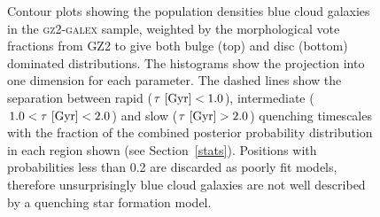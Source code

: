 \begin{figure}
\caption[Population densities of blue smooth and disc galaxies]{Contour plots showing the population densities blue cloud galaxies in the \textsc{gz2-galex} sample, weighted by the morphological vote fractions from GZ2 to give both bulge (top) and disc (bottom) dominated distributions. The histograms show the projection into one dimension for each parameter. The dashed lines show the separation between rapid ($\tau ~\rm{[Gyr]} < 1.0$), intermediate ($1.0 < \tau ~\rm{[Gyr]} < 2.0$) and slow ($\tau ~\rm{[Gyr]} > 2.0$) quenching timescales with the fraction of the combined posterior probability distribution in each region shown (see Section~\ref{stats}). Positions with probabilities less than 0.2 are discarded as poorly fit models, therefore unsurprisingly blue cloud galaxies are not well described by a quenching star formation model. }
\label{blue_c}
\end{figure}

